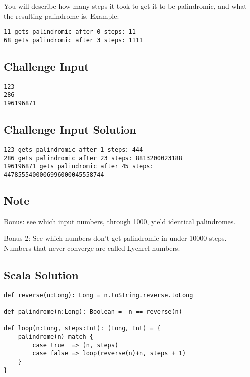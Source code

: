 You will describe how many steps it took to get it to be palindromic,
and what the resulting palindrome is. Example:

\begin{verbatim}
11 gets palindromic after 0 steps: 11
68 gets palindromic after 3 steps: 1111
\end{verbatim}

\subsection{Challenge Input}\label{challenge-input-5}

\begin{verbatim}
123
286
196196871
\end{verbatim}

\subsection{Challenge Input Solution}\label{challenge-input-solution}

\begin{verbatim}
123 gets palindromic after 1 steps: 444
286 gets palindromic after 23 steps: 8813200023188
196196871 gets palindromic after 45 steps: 4478555400006996000045558744
\end{verbatim}

\subsection{Note}\label{note}

Bonus: see which input numbers, through 1000, yield identical
palindromes.

Bonus 2: See which numbers don't get palindromic in under 10000 steps.
Numbers that never converge are called Lychrel numbers.

\subsection{Scala Solution}\label{scala-solution-5}

\begin{verbatim}
def reverse(n:Long): Long = n.toString.reverse.toLong

def palindrome(n:Long): Boolean =  n == reverse(n)

def loop(n:Long, steps:Int): (Long, Int) = {
    palindrome(n) match {
        case true  => (n, steps)
        case false => loop(reverse(n)+n, steps + 1)
    }
}
\end{verbatim}

